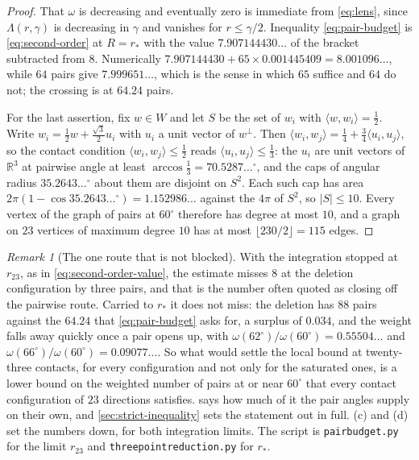 \documentclass[11pt,reqno]{amsart}
\renewcommand{\_}{\origunderscore\allowbreak}
\numberwithin{equation}{section}
\theoremstyle{plain}
\theoremstyle{definition}
\theoremstyle{remark}
\newtheorem{remark}[thm]{Remark}
\begin{document}
\begin{proof}
That $\omega$ is decreasing and eventually zero is immediate from
\eqref{eq:lens}, since $\Lambda(r,\gamma)$ is decreasing in $\gamma$ and
vanishes for $r\le\gamma/2$. Inequality \eqref{eq:pair-budget} is
\eqref{eq:second-order} at $R=r_*$ with the value $7.907144430\ldots$ of
the bracket subtracted from $8$. Numerically
$7.907144430+65\times0.001445409=8.001096\ldots$, while $64$ pairs
give $7.999651\ldots$, which is the sense in which $65$ suffice and
$64$ do not; the crossing is at $64.24$ pairs.

For the last assertion, fix $w\in W$ and let $S$ be the set of $w_i$
with $\langle w,w_i\rangle=\tfrac12$. Write
$w_i=\tfrac12w+\tfrac{\sqrt3}2u_i$ with $u_i$ a unit vector of
$w^{\perp}$. Then
$\langle w_i,w_j\rangle=\tfrac14+\tfrac34\langle u_i,u_j\rangle$, so the
contact condition $\langle w_i,w_j\rangle\le\tfrac12$ reads
$\langle u_i,u_j\rangle\le\tfrac13$: the $u_i$ are unit vectors of
$\mathbb{R}^3$ at pairwise angle at least
$\arccos\tfrac13=70.5287\ldots^\circ$, and the caps of angular radius
$35.2643\ldots^\circ$ about them are disjoint on $S^2$. Each such cap
has area $2\pi(1-\cos35.2643\ldots^\circ)=1.152986\ldots$ against the
$4\pi$ of $S^2$, so $|S|\le10$. Every vertex of the graph of pairs at
$60^\circ$ therefore has degree at most $10$, and a graph on $23$
vertices of maximum degree $10$ has at most
$\lfloor 230/2\rfloor=115$ edges.
\end{proof}

\begin{remark}[The one route that is not blocked]\label{rem:pair-budget}
With the integration stopped at $r_{23}$, as in
\eqref{eq:second-order-value}, the estimate misses $8$ at the deletion
configuration by three pairs, and that is the number often quoted as
closing off the pairwise route. Carried to $r_*$ it does not miss: the
deletion has $88$ pairs against the $64.24$ that \eqref{eq:pair-budget}
asks for, a surplus of $0.034$, and the weight falls away quickly once a
pair opens up, with $\omega(62^\circ)/\omega(60^\circ)=0.55504\ldots$
and $\omega(66^\circ)/\omega(60^\circ)=0.09077\ldots$. So what would
settle the local bound at twenty-three contacts, for every
configuration and not only for the saturated ones, is a lower bound on
the weighted number of pairs at or near $60^\circ$ that every contact
configuration of $23$ directions satisfies. 
says how much of it the pair angles supply on their own, and
\cref{sec:strict-inequality} sets the statement out in full.
(c) and (d) set the numbers down, for both
integration limits. The script is \texttt{pair\_budget.py} for the
limit $r_{23}$ and \texttt{three\_point\_reduction.py} for $r_*$.
\end{remark}
\end{document}
